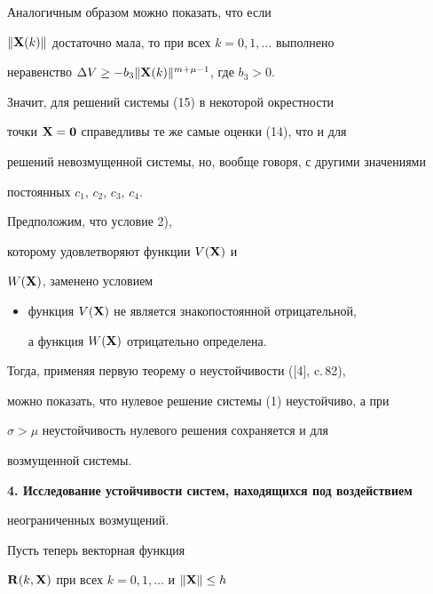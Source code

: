 \begin{note}


Аналогичным образом можно показать, что если


$\|\bold X(k)\|$ достаточно мала, то при всех $k=0,1,\dotsc$ выполнено


неравенство $\Delta V\geq -b_3 \|\bold X(k)\|^{m+\mu-1}$, где $b_3>0$. 


Значит, для решений системы (15) в некоторой окрестности


точки $\bold X=\bold 0$ справедливы те же самые оценки (14), что и для


решений невозмущенной системы, но, вообще говоря, с другими значениями


постоянных $c_1$, $c_2$, $c_3$, $c_4$.


\end{note}





\begin{note}


Предположим, что условие 2), %


которому удовлетворяют функции $V(\bold X)$ и


$W(\bold X)$, заменено условием


\begin{itemize}


\item[2$'$)] функция $V(\bold X)$ не является знакопостоянной отрицательной,


а функция $W(\bold X)$ отрицательно определена.


\end{itemize}


Тогда, применяя первую теорему о неустойчивости ([4], c.\,82),


можно показать, что нулевое решение системы (1) неустойчиво, а при


$\sigma>\mu$ неустойчивость нулевого решения сохраняется и для


возмущенной системы.


\end{note}





{\bf 4. Исследование устойчивости систем, находящихся под воздействием


неограниченных возмущений.} Пусть теперь векторная функция


$\bold R(k,\bold X)$ при всех $k=0,1,\dotsc$ и $\|\bold X\|\leq h$


